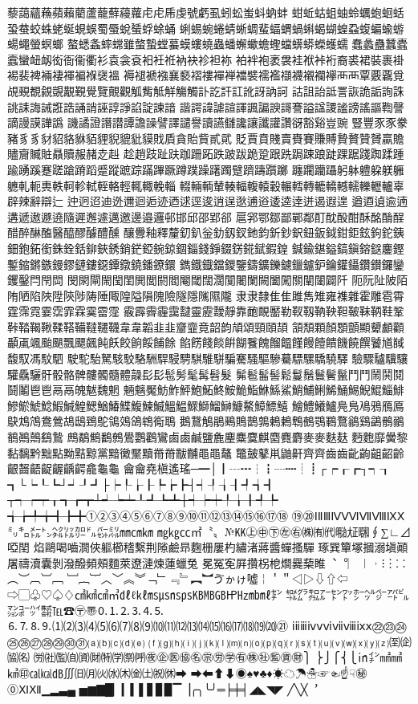 藜藹蘊蘓蘋藾藺蘆蘢蘚蘰蘿⾌虍乕虔號虧虱蚓蚣蚩蚪蚋蚌
蚶蚯蛄蛆蚰蛉蠣蚫蛔蛞蛩蛬蛟蛛蛯蜒蜆蜈蜀蜃蛻蜑蜉蜍蛹
蜊蜴蜿蜷蜻蜥蜩蜚蝠蝟蝸蝌蝎蝴蝗蝨蝮蝙蝓蝣蝪蠅螢螟螂
螯蟋螽蟀蟐雖螫蟄螳蟇蟆螻蟯蟲蟠蠏蠍蟾蟶蟷蠎蟒蠑蠖蠕
蠢蠡蠱蠶蠹蠧蠻衄衂衒衙衞衢衫袁衾袞衵衽袵衲袂袗袒袮
袙袢袍袤袰袿袱裃裄裔裘裙裝裹褂裼裴裨裲褄褌褊褓襃褞
褥褪褫襁襄褻褶褸襌褝襠襞襦襤襭襪襯襴襷⾑襾覃覈覊覓
覘覡覩覦覬覯覲覺覽覿觀觚觜觝觧觴觸訃訖訐訌訛訝訥訶
詁詛詒詆詈詼詭詬詢誅誂誄誨誡誑誥誦誚誣諄諍諂諚諫諳
諧諤諱謔諠諢諷諞諛謌謇謚諡謖謐謗謠謳鞫謦謫謾謨譁譌
譏譎證譖譛譚譫譟譬譯譴譽讀讌讎讒讓讖讙讚谺豁谿豈豌
豎豐⾗豕豢豬⾘豸豺貂貉貅貊貍貎貔豼貘戝貭貪貽貲貳貮
貶賈賁賤賣賚賽賺賻贄贅贊贇贏贍贐齎贓賍贔贖赧赭赱赳
趁趙跂趾趺跏跚跖跌跛跋跪跫跟跣跼踈踉跿踝踞踐踟蹂踵
踰踴蹊蹇蹉蹌蹐蹈蹙蹤蹠踪蹣蹕蹶蹲蹼躁躇躅躄躋躊躓躑
躔躙躪躡躬躰軆躱躾軅軈軋軛軣軼軻軫軾輊輅輕輒輙輓輜
輟輛輌輦輳輻輹轅轂輾轌轉轆轎轗轜轢轣轤辜辟辣辭辯辷
迚迥迢迪迯邇迴逅迹迺逑逕逡逍逞逖逋逧逶逵逹迸遏遐遑
遒逎遉逾遖遘遞遨遯遶隨遲邂遽邁邀邊邉邏邨邯邱邵郢郤
扈郛鄂鄒鄙鄲鄰酊酖酘酣酥酩酳酲醋醉醂醢醫醯醪醵醴醺
釀釁釉釋釐釖釟釡釛釼釵釶鈞釿鈔鈬鈕鈑鉞鉗鉅鉉鉤鉈銕
鈿鉋鉐銜銖銓銛鉚鋏銹銷鋩錏鋺鍄錮錙錢錚錣錺錵錻鍜鍠
鍼鍮鍖鎰鎬鎭鎔鎹鏖鏗鏨鏥鏘鏃鏝鏐鏈鏤鐚鐔鐓鐃鐇鐐鐶
鐫鐵鐡鐺鑁鑒鑄鑛鑠鑢鑞鑪鈩鑰鑵鑷鑽鑚鑼鑾钁鑿閂閇閊
閔閖閘閙閠閨閧閭閼閻閹閾闊濶闃闍闌闕闔闖關闡闥闢阡
阨阮阯陂陌陏陋陷陜陞陝陟陦陲陬隍隘隕隗險隧隱隲隰隴
⾪隶隸⾫隹雎雋雉雍襍雜霍雕雹霄霆霈霓霎霑霏霖霙霤霪
霰霹霽霾靄靆靈靂靉靜靠靤靦靨勒靫靱靹鞅靼鞁靺鞆鞋鞏
鞐鞜鞨鞦鞣鞳鞴韃韆韈⾱韋韜⾲韭齏韲竟韶韵頏頌頸頤頡
頷頽顆顏顋顫顯顰顱顴顳颪颯颱颶飄飃飆飩飫餃餉餒餔餘
餡餝餞餤餠餬餮餽餾饂饉饅饐饋饑饒饌饕馗馘馥馭馮馼駟
駛駝駘駑駭駮駱駲駻駸騁騏騅駢騙騫騷驅驂驀驃騾驕驍驛
驗驟驢驥驤驩驫驪骭骰骼髀髏髑髓體髞⾽髟髢髣髦髯髫髮
髴髱髷髻鬆鬘鬚鬟鬢鬣⾾鬥鬧鬨鬩鬪鬮⾿鬯鬲⿀魄魃魏魍
魎魑魘魴鮓鮃鮑鮖鮗鮟鮠鮨鮴鯀鯊鮹鯆鯏鯑鯒鯣鯢鯤鯔鯡
鰺鯲鯱鯰鰕鰔鰉鰓鰌鰆鰈鰒鰊鰄鰮鰛鰥鰤鰡鰰鱇鰲鱆鰾鱚
鱠鱧鱶鱸鳧鳬鳰鴉鴈鳫鴃鴆鴪鴦鶯鴣鴟鵄鴕鴒鵁鴿鴾鵆鵈
鵝鵞鵤鵑鵐鵙鵲鶉鶇鶫鵯鵺鶚鶤鶩鶲鷄鷁鶻鶸鶺鷆鷏鷂鷙
鷓鷸鷦鷭鷯鷽鸚鸛鸞⿄鹵鹹鹽麁麈麋麌麒麕麑麝⿆麥麩麸
麪麭靡黌黎黏黐黔黜點黝黠黥黨黯黴黶黷⿋黹黻黼⿌黽鼇
鼈皷鼕鼡鼬鼾齊⿑齒⿒齔齣齟齠齡齦齧齬齪齷齲齶龕龜⿔
龠⿕堯槇遙瑤─━│┃┄┅┆┇┈┉┊┋┌┍┎┏┐┑┒
┓└┕┖┗┘┙┚┛├┝┞┟┠┡┢┣┤┥┦┧┨┩┪┫
┬┭┮┯┰┱┲┳┴┵┶┷┸┹┺┻┼┽┾┿╀╁╂╃╄
╅╆╇╈╉╊╋①②③④⑤⑥⑦⑧⑨⑩⑪⑫⑬⑭⑮⑯⑰⑱
⑲⑳ⅠⅡⅢⅣⅤⅥⅦⅧⅨⅩ㍉㌔㍍㌧㌶㍑㌍㌦㌫㍊㎜㎝㎞
㎎㎏㏄㎡〝〟№㏍㊤㊥㊦㊧㊨㈱㈲㈹㍾㍽㍼∮∑∟⊿啞𨳝
焰鷗喝嚙㵎俠軀櫛𥡴繫荆𨻶鹼昻麴栅屢杓繡渚蔣醬蟬搔驒
琢巽簞塚摑溺塡顚屠禱瀆囊剝潑醱頻頰麵萊遼漣煉蓮蠟兔
冕冤𡨚屛攢柺梎𤏐爨蔾睢︑︒︳︱︲⁝︙⁚︰︵︶︹︺﹇
﹈︷︸︿﹀︽︾﹁﹂﹃﹄︻︼ゔゕゖ噓￤＇＂◁▷⇩⇧⇦
⇨▢♧♡♤♢㎠㎢㎤㎥㎗ℓ㎘㎳㎲㎱㎰㎅㎆㎇㏋㎐㏔㎖㌢
㌖㌘㌕㌃㌣㍗㍂㌹㌻㌀㌱㍇㌞㌪㍿℡☎〶〠🄀⒈⒉⒊⒋⒌
⒍⒎⒏⒐⑴⑵⑶⑷⑸⑹⑺⑻⑼⑽⑾⑿⒀⒁⒂⒃⒄⒅⒆⒇㉑
ⅰⅱⅲⅳⅴⅵⅶⅷⅸⅹ㉒㉓㉔㉕㉖㉗㉘㉙㉚㉛⒜⒝⒞⒟⒠
⒡⒢⒣⒤⒥⒦⒧⒨⒩⒪⒫⒬⒭⒮⒯⒰⒱⒲⒳⒴⒵㉃㈽㈿㈴
㈸㈳㈼㉂㈾㈶㈵㈻㉀㈺㊰㊭㊩㊯㊔㊪㊘㊫㊒㊑㊓㊬㊮㊖⎫
⎬⎭⎧⎨⎩㏌㌅㎟㎣㎦㊞㎈㎉㏈∭㈰㈪㈫㈬㈭㈮㈯㈷㉁➡
⮕⬅⬆⬇◉♠♥♣♦☀☁☂☃☞☜☝☟㊙⓪ⅪⅫ▁▂▃▄
▅▆▇█▏▎▍▌▋▊▉▔▕╭╮╰╯═╞╪╡◢◣◥◤
╱╲╳︐

